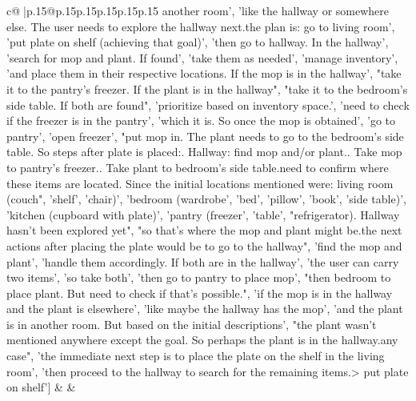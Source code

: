 \documentclass{article}
\begin{document}
{\begin{supertabular}{c@{$\;$}|p{.15\linewidth}@{}p{.15\linewidth}p{.15\linewidth}p{.15\linewidth}p{.15\linewidth}p{.15\linewidth}}
{{{another room', 'like the hallway or somewhere else. The user needs to explore the hallway next.\n\nSo the plan is: go to living room', 'put plate on shelf (achieving that goal)', 'then go to hallway. In the hallway', 'search for mop and plant. If found', 'take them as needed', 'manage inventory', 'and place them in their respective locations. If the mop is in the hallway', "take it to the pantry's freezer. If the plant is in the hallway", "take it to the bedroom's side table. If both are found", 'prioritize based on inventory space.\n\nAlso', 'need to check if the freezer is in the pantry', 'which it is. So once the mop is obtained', 'go to pantry', 'open freezer', "put mop in. The plant needs to go to the bedroom's side table. So steps after plate is placed:\n{}. Hallway: find mop and/or plant.. Take mop to pantry's freezer.. Take plant to bedroom's side table.\n\nBut need to confirm where these items are located. Since the initial locations mentioned were: living room (couch", 'shelf', 'chair)', 'bedroom (wardrobe', 'bed', 'pillow', 'book', 'side table)', 'kitchen (cupboard with plate)', 'pantry (freezer', 'table', "refrigerator). Hallway hasn't been explored yet", "so that's where the mop and plant might be.\n\nSo the next actions after placing the plate would be to go to the hallway", 'find the mop and plant', 'handle them accordingly. If both are in the hallway', 'the user can carry two items', 'so take both', 'then go to pantry to place mop', "then bedroom to place plant. But need to check if that's possible.\n\nAlternatively", 'if the mop is in the hallway and the plant is elsewhere', 'like maybe the hallway has the mop', 'and the plant is in another room. But based on the initial descriptions', "the plant wasn't mentioned anywhere except the goal. So perhaps the plant is in the hallway.\n\nIn any case", 'the immediate next step is to place the plate on the shelf in the living room', 'then proceed to the hallway to search for the remaining items.\n> put plate on shelf'] 
	  } 
	   } 
	   } 
	 & & \\ 
 

    \theutterance {}  


\end{supertabular}}
\end{document}
